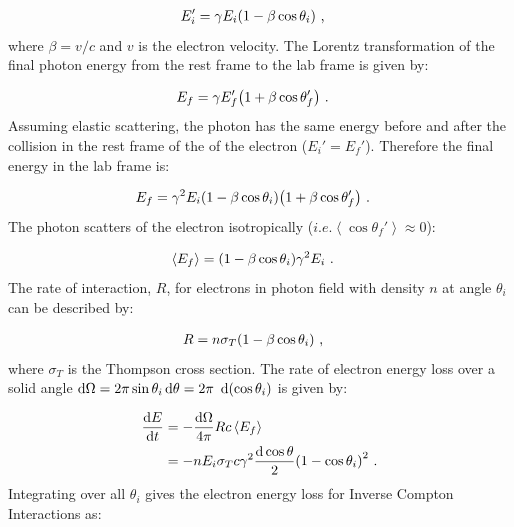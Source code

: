 \begin{equation}
    \begin{aligned}
        E_i'&=\gamma E_i\qty(1-\beta \cos\theta_i)\text{ ,}
    \end{aligned}    
\end{equation}
\noindent where $\beta = v/c$ and $v$ is the electron velocity. The Lorentz transformation of the final photon energy from the rest frame to the lab frame is given by:

\begin{equation}
	\begin{aligned}
		E_f&=\gamma E_f'\qty(1+\beta\cos\theta_f')\text{ .}
    \end{aligned}
\end{equation}
\noindent Assuming elastic scattering, the photon has the same energy before and after the collision in the rest frame of the of the electron ($E_i'=E_f'$). Therefore the final energy in the lab frame is:

\begin{equation}
    \begin{aligned}
		E_f&=\gamma^2E_i\qty(1-\beta\cos\theta_i)\qty(1+\beta\cos\theta_f')\text{ .}
	\end{aligned}
\end{equation}
\noindent The photon scatters of the electron isotropically ($i.e.\left\langle\cos\theta_f'\right\rangle\approx 0$):

\begin{equation}
    \begin{aligned}
    \left\langle E_f\right\rangle&=\qty(1-\beta\cos\theta_i)\gamma^2 E_i\text{ .}
    \end{aligned}
\end{equation}
\noindent The rate of interaction, $R$, for electrons in photon field with density $n$ at angle $\theta_i$ can be described by:

\begin{equation}
    \begin{aligned}
    R&=n\sigma_T\qty(1-\beta\cos\theta_i)\text{ ,}
    \end{aligned}
\end{equation}
\noindent where $\sigma_T$ is the Thompson cross section. The rate of electron energy loss over a solid angle $\dd{\Omega}=2\pi\sin\theta_i\dd{\theta}=2\pi~\dd{\qty(\cos\theta_i)}$ is given by:

\begin{equation}
	\begin{split}
		\dv{E}{t}&=-\frac{\dd{\Omega}}{4\pi}Rc\left\langle E_f\right\rangle \\
		&=-nE_i\sigma_T c\gamma^2\frac{\dd{\cos\theta}}{2}\qty(1-\cos\theta_i)^2\text{ .}
	\end{split}
\end{equation}
\noindent Integrating over all $\theta_i$ gives the electron energy loss for Inverse Compton Interactions as:


